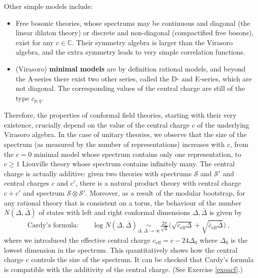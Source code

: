 \documentclass[12pt, a4paper, notitlepage, twoside]{report}
\numberwithin{equation}{section}
\theoremstyle{break}
\begin{document}
Other simple models include:
\begin{itemize}
 \item Free bosonic theories, whose spectrums may be continuous and diagonal (the linear dilaton theory) or discrete and non-diagonal (compactified free bosons), exist for any $c\in {\mathbb{C}}$.
Their symmetry algebra is larger than the Virasoro algebra, and  
the extra symmetry leads to very simple correlation functions.
 \item 
(Virasoro) \textbf{minimal models} are by definition rational models, and beyond the A-series there exist two other series, called the 
D- and E-series, which are not diagonal.
The corresponding values of the central charge are still of the type $c_{p,q}$.
\end{itemize}
Therefore,
the properties of conformal field theories, starting with their very existence, crucially depend on the value of the central charge $c$ of the underlying Virasoro algebra.
In the case of unitary theories, we observe that the size of the spectrum (as measured by the number of representations) increases with $c$, from the $c=0$ minimal model whose spectrum contains only one representation, to $c\geq 1$ Liouville theory whose spectrum contains infinitely many.
The central charge is actually additive: given two theories with spectrums $\mathcal{S}$ and $\mathcal{S}'$ and central charges $c$ and $c'$, there is a natural product theory with central charge $c+c'$ and spectrum $\mathcal{S}\otimes \mathcal{S}'$.
Moreover, as a result of the modular bootstrap, for any rational theory that is consistent on a torus, 
the behaviour of the number $N(\Delta,\bar{\Delta})$ of states with left and right conformal dimensions $\Delta,\bar{\Delta}$ is given by 
\begin{align}
\text{Cardy's formula:} \qquad \log N(\Delta,\bar{\Delta}) \underset{\Delta,\bar{\Delta}\to \infty}{\sim} \frac{2\pi}{\sqrt{6}} \Big(\sqrt{c_\text{eff} \Delta} + \sqrt{\bar c_\text{eff} \bar\Delta}\Big)\ ,
\label{nds}
\end{align}
where we introduced the effective central charge $c_\text{eff}=c-24\Delta_0$ where $\Delta_0$ is the lowest dimension in the spectrum.
This quantitatively shows how the central charge $c$ controls the size of the spectrum.
It can be checked that Cardy's formula is compatible with the additivity of the central charge. (See Exercise \ref{exoacf}.)
\end{document}

